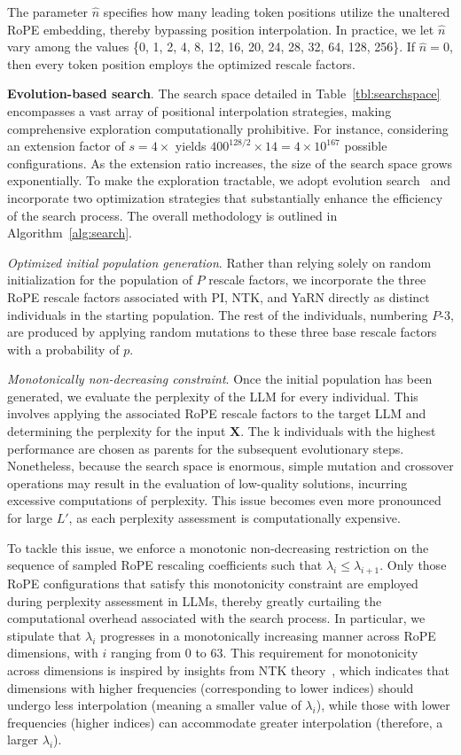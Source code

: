 The parameter $\hat{n}$ specifies how many leading token positions utilize the unaltered RoPE embedding, thereby bypassing position interpolation. In practice, we let $\hat{n}$ vary among the values \{0, 1, 2, 4, 8, 12, 16, 20, 24, 28, 32, 64, 128, 256\}. If $\hat{n}=0$, then every token position employs the optimized rescale factors.

\textbf{Evolution-based search}. The search space detailed in Table~\ref{tbl:searchspace} encompasses a vast array of positional interpolation strategies, making comprehensive exploration computationally prohibitive. For instance, considering an extension factor of $s=4\times$ yields $400^{128/2}\times14=4\times10^{167}$ possible configurations. As the extension ratio increases, the size of the search space grows exponentially. To make the exploration tractable, we adopt evolution search~\cite{guo2020single} and incorporate two optimization strategies that substantially enhance the efficiency of the search process. The overall methodology is outlined in Algorithm~\ref{alg:search}.

\textit{Optimized initial population generation}. Rather than relying solely on random initialization for the population of $P$ rescale factors, we incorporate the three RoPE rescale factors associated with PI, NTK, and YaRN directly as distinct individuals in the starting population. The rest of the individuals, numbering $P$-3, are produced by applying random mutations to these three base rescale factors with a probability of $p$.

\textit{Monotonically non-decreasing constraint}. Once the initial population has been generated, we evaluate the perplexity of the LLM for every individual. This involves applying the associated RoPE rescale factors to the target LLM and determining the perplexity for the input $\mathbf{X}$. The k individuals with the highest performance are chosen as parents for the subsequent evolutionary steps. Nonetheless, because the search space is enormous, simple mutation and crossover operations may result in the evaluation of low-quality solutions, incurring excessive computations of perplexity. This issue becomes even more pronounced for large $L'$, as each perplexity assessment is computationally expensive.

To tackle this issue, we enforce a monotonic non-decreasing restriction on the sequence of sampled RoPE rescaling coefficients such that $\lambda_i \le \lambda_{i+1}$. Only those RoPE configurations that satisfy this monotonicity constraint are employed during perplexity assessment in LLMs, thereby greatly curtailing the computational overhead associated with the search process. In particular, we stipulate that $\lambda_i$ progresses in a monotonically increasing manner across RoPE dimensions, with $i$ ranging from $0$ to $63$. This requirement for monotonicity across dimensions is inspired by insights from NTK theory~\cite{jacot2018neural,tancik2020fourier,ntk}, which indicates that dimensions with higher frequencies (corresponding to lower indices) should undergo less interpolation (meaning a smaller value of $\lambda_i$), while those with lower frequencies (higher indices) can accommodate greater interpolation (therefore, a larger $\lambda_i$).

